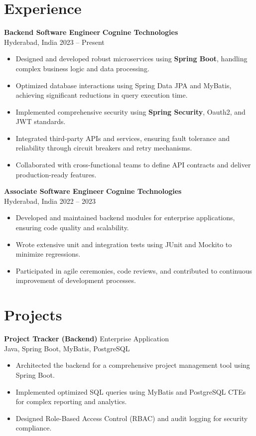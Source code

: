 \documentclass[11pt]{article}
\begin{document}
\section*{Experience}

\textbf{Backend Software Engineer} \hfill \textbf{Cognine Technologies} \\
Hyderabad, India \hfill 2023 -- Present
\begin{itemize}
    \item Designed and developed robust microservices using \textbf{Spring Boot}, handling complex business logic and data processing.
    \item Optimized database interactions using Spring Data JPA and MyBatis, achieving significant reductions in query execution time.
    \item Implemented comprehensive security using \textbf{Spring Security}, Oauth2, and JWT standards.
    \item Integrated third-party APIs and services, ensuring fault tolerance and reliability through circuit breakers and retry mechanisms.
    \item Collaborated with cross-functional teams to define API contracts and deliver production-ready features.
\end{itemize}

\textbf{Associate Software Engineer} \hfill \textbf{Cognine Technologies} \\
Hyderabad, India \hfill 2022 -- 2023
\begin{itemize}
    \item Developed and maintained backend modules for enterprise applications, ensuring code quality and scalability.
    \item Wrote extensive unit and integration tests using JUnit and Mockito to minimize regressions.
    \item Participated in agile ceremonies, code reviews, and contributed to continuous improvement of development processes.
\end{itemize}

\section*{Projects}

\textbf{Project Tracker (Backend)} \hfill Enterprise Application \\
Java, Spring Boot, MyBatis, PostgreSQL
\begin{itemize}
    \item Architected the backend for a comprehensive project management tool using Spring Boot.
    \item Implemented optimized SQL queries using MyBatis and PostgreSQL CTEs for complex reporting and analytics.
    \item Designed Role-Based Access Control (RBAC) and audit logging for security compliance.
\end{itemize}
\end{document}
